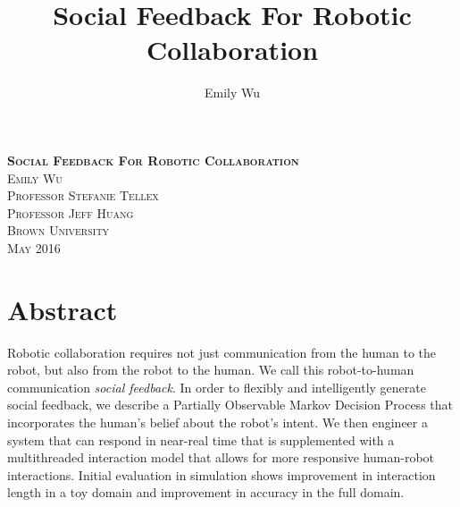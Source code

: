 \documentclass{article}
\title{Social Feedback For Robotic Collaboration}
\author{Emily Wu}
\begin{document}

\vspace*{8cm}

\begin{raggedleft}
	\scshape
	\huge \textbf{Social Feedback For Robotic Collaboration} \\
	\vspace{0.3cm}
	\Large 
	Emily Wu  \\
	Professor Stefanie Tellex \\
	Professor Jeff Huang \\
	Brown University \\
	May 2016 \\
\end{raggedleft}

\newpage



\vspace*{\fill}
\section*{Abstract}
Robotic collaboration requires not just communication from the human to the robot, but also from the robot to the human. We call this robot-to-human communication \emph{social feedback}. In order to flexibly and intelligently generate social feedback, we describe a Partially Observable Markov Decision Process that incorporates the human's belief about the robot's intent. We then engineer a system that can respond in near-real time that is supplemented with a multithreaded interaction model that allows for more responsive human-robot interactions. Initial evaluation in simulation shows improvement in interaction length in a toy domain and improvement in accuracy in the full domain.
\vspace*{\fill}
\newpage
\tableofcontents
\newpage
{} 
\end{document}
